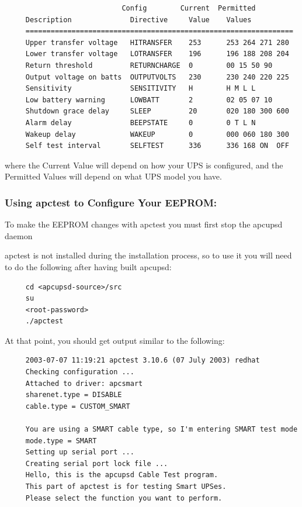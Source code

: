 {{{{{{{{\begin{verbatim}
                            Config        Current  Permitted
     Description              Directive     Value    Values
     ================================================================
     Upper transfer voltage   HITRANSFER    253      253 264 271 280
     Lower transfer voltage   LOTRANSFER    196      196 188 208 204
     Return threshold         RETURNCHARGE  0        00 15 50 90
     Output voltage on batts  OUTPUTVOLTS   230      230 240 220 225
     Sensitivity              SENSITIVITY   H        H M L L
     Low battery warning      LOWBATT       2        02 05 07 10
     Shutdown grace delay     SLEEP         20       020 180 300 600
     Alarm delay              BEEPSTATE     0        0 T L N
     Wakeup delay             WAKEUP        0        000 060 180 300
     Self test interval       SELFTEST      336      336 168 ON  OFF
\end{verbatim}
\normalsize

where the Current Value will depend on how your UPS is configured, and the
Permitted Values will depend on what UPS model you have. 

\label{Using-apctest-to-Configure-Your-EEPROM}

\subsubsection*{Using apctest to Configure Your EEPROM:}

\label{index-eeprom_002c-apctest-142}
\label{index-apctest-setting-eeprom-143}
To make the EEPROM changes with apctest you must first stop the apcupsd daemon
 

apctest is not installed during the installation process, so to use it you
will need to do the following after having built apcupsd: 

\footnotesize
\begin{verbatim}
     cd <apcupsd-source>/src
     su
     <root-password>
     ./apctest
\end{verbatim}
\normalsize

At that point, you should get output similar to the following: 

\footnotesize
\begin{verbatim}
     2003-07-07 11:19:21 apctest 3.10.6 (07 July 2003) redhat
     Checking configuration ...
     Attached to driver: apcsmart
     sharenet.type = DISABLE
     cable.type = CUSTOM_SMART
     
     You are using a SMART cable type, so I'm entering SMART test mode
     mode.type = SMART
     Setting up serial port ...
     Creating serial port lock file ...
     Hello, this is the apcupsd Cable Test program.
     This part of apctest is for testing Smart UPSes.
     Please select the function you want to perform.
     

\end{verbatim}}}}}}}}}
